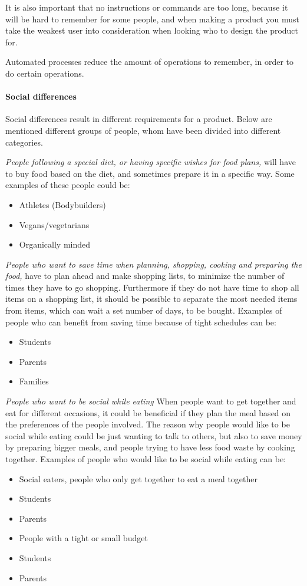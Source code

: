 It is also important that no instructions or commands are too long, because it will be hard to remember for some people, and when making a product you must take the weakest user into consideration when looking who to design the product for.

Automated processes reduce the amount of operations to remember, in order to do certain operations.

\paragraph{Social differences}
Social differences result in different requirements for a product. Below are mentioned different groups of people, whom have been divided into different categories.

\emph{People following a special diet, or having specific wishes for food plans,}
will have to buy food based on the diet, and sometimes prepare it in a specific way. Some examples of these people could be:
\begin{itemize}
\item Athletes (Bodybuilders)
\item Vegans/vegetarians
\item Organically minded
\end{itemize}

\emph{People who want to save time when planning, shopping, cooking and preparing the food,}
have to plan ahead and make shopping lists, to minimize the number of times they have to go shopping. Furthermore if they do not have time to shop all items on a shopping list, it should be possible to separate the most needed items from items, which can wait a set number of days, to be bought. Examples of people who can benefit from saving time because of tight schedules can be:
\begin{itemize}
\item Students
\item Parents
\item Families
\end{itemize}

\emph{People who want to be social while eating}
When people want to get together and eat for different occasions, it could be beneficial if they plan the meal based on the preferences of the people involved. The reason why people would like to be social while eating could be just wanting to talk to others, but also to save money by preparing bigger meals, and people trying to have less food waste by cooking together. Examples of people who would like to be social while eating can be:
\begin{itemize}
\item Social eaters, people who only get together to eat a meal together
\item Students
\item Parents
\item People with a tight or small budget
\item Students
\item Parents
\end{itemize}

